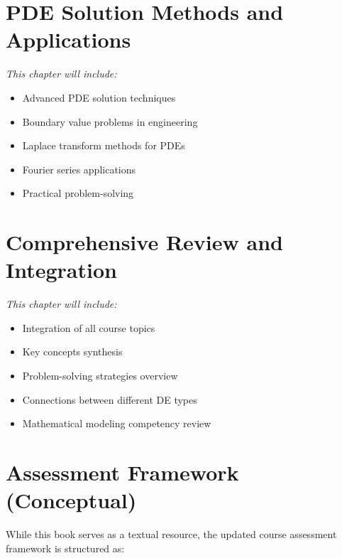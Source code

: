 \documentclass[12pt, letterpaper]{book}
\theoremstyle{problemstyle}
\theoremstyle{solutionstyle}
\begin{document}
\chapter{PDE Solution Methods and Applications}
\label{chap:session_19}

\textit{This chapter will include:}
\begin{itemize}
    \item Advanced PDE solution techniques
    \item Boundary value problems in engineering
    \item Laplace transform methods for PDEs
    \item Fourier series applications
    \item Practical problem-solving
\end{itemize}


\chapter{Comprehensive Review and Integration}
\label{chap:session_20}

\textit{This chapter will include:}
\begin{itemize}
    \item Integration of all course topics
    \item Key concepts synthesis
    \item Problem-solving strategies overview
    \item Connections between different DE types
    \item Mathematical modeling competency review
\end{itemize}

\appendix
\chapter{Assessment Framework (Conceptual)}
\label{app:assessment}
While this book serves as a textual resource, the updated course assessment framework is structured as:
\end{document}
